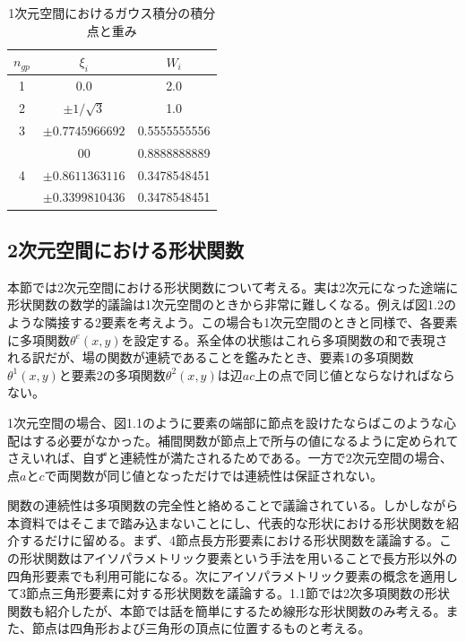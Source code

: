 \documentclass[dvipdfmx, 9pt, a4paper]{jsarticle}
\numberwithin{equation}{section}
\begin{document}
\begin{table}[t]
\begin{center}
\caption{1次元空間におけるガウス積分の積分点と重み}
\begin{tabular}{ccc}
\hline \hline
$n_{gp}$ & $\xi_i$ & $W_i$ \\ \hline \hline
1 & 0.0 & 2.0 \\ \hline
2 & $\pm 1/\sqrt{3}$ & 1.0 \\ \hline
3 & $\pm0.7745966692$ & 0.5555555556 \\
 & 00 & 0.8888888889 \\ \hline
4 & $\pm 0.8611363116$ & 0.3478548451 \\
 & $\pm 0.3399810436$ & 0.3478548451 \\ \hline
\end{tabular}
\end{center}
\end{table}

\subsection{2次元空間における形状関数}
本節では2次元空間における形状関数について考える。実は2次元になった途端に形状関数の数学的議論は1次元空間のときから非常に難しくなる。例えば図1.2のような隣接する2要素を考えよう。この場合も1次元空間のときと同様で、各要素に多項関数$\theta^e(x, y)$を設定する。系全体の状態はこれら多項関数の和で表現される訳だが、場の関数が連続であることを鑑みたとき、要素1の多項関数$\theta^1(x, y)$と要素2の多項関数$\theta^2(x,y)$は辺$ac$上の点で同じ値とならなければならない。\par
1次元空間の場合、図1.1のように要素の端部に節点を設けたならばこのような心配はする必要がなかった。補間関数が節点上で所与の値になるように定められてさえいれば、自ずと連続性が満たされるためである。一方で2次元空間の場合、点$a$と$c$で両関数が同じ値となっただけでは連続性は保証されない。\par
関数の連続性は多項関数の完全性と絡めることで議論されている。しかしながら本資料ではそこまで踏み込まないことにし、代表的な形状における形状関数を紹介するだけに留める。まず、4節点長方形要素における形状関数を議論する。この形状関数はアイソパラメトリック要素という手法を用いることで長方形以外の四角形要素でも利用可能になる。次にアイソパラメトリック要素の概念を適用して3節点三角形要素に対する形状関数を議論する。1.1節では2次多項関数の形状関数も紹介したが、本節では話を簡単にするため線形な形状関数のみ考える。また、節点は四角形および三角形の頂点に位置するものと考える。
\end{document}
